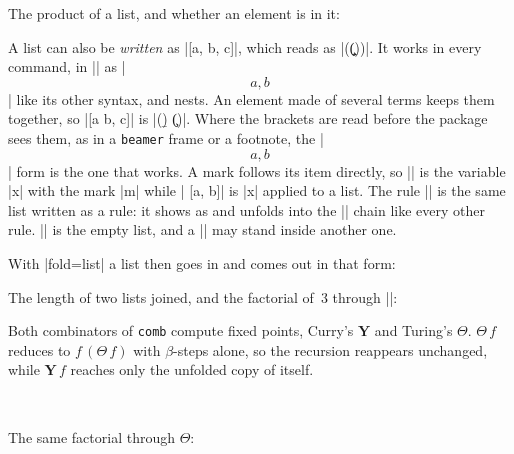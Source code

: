 \documentclass[parskip=half,english,numbers=noenddot,footnotes=nomultiple,oneside]{scrartcl}
\begin{document}
The product of a list, and whether an element is in it:
\begin{wideexample}
 \quad
{}
\end{wideexample}
A list can also be \emph{written} as |[a, b, c]|, which reads as |\cons \a (\cons \b (\cons \c \nil))|. It works in every command, in |\RLC| as |\[a, b\]| like its other syntax, and nests. An element made of several terms keeps them together, so |[a b, c]| is |\cons (\a \b) (\cons \c \nil)|. Where the brackets are read before the package sees them, as in a \texttt{beamer} frame or a footnote, the |\[a, b\]| form is the one that works. A mark follows its item directly, so |\x[m]| is the variable |x| with the mark |m| while | [a, b]| is |x| applied to a list. The rule || is the same list written as a rule: it shows as \LC[rule-depth=0]{\list{\a, \b, \c}} and unfolds into the |\cons| chain like every other rule. |\list{}| is the empty list, and a |\list| may stand inside another one.
\begin{wideexample}
\LC{\list{\a, \b, \c}} \quad
\lcNormalForm[fold=list, max-steps=500]{\tail (\list{\a, \b, \c})}
\end{wideexample}
With |fold=list| a list then goes in and comes out in that form:
\begin{wideexample}
\lcNormalForm[show-term, fold={list, num}, max-steps=500]
   {\append [\a] [\b]} \quad
\lcNormalForm[show-term, fold={list, num}, max-steps=500]
   {\tail [\a, \b]}
\end{wideexample}
\begin{wideexample}
 \quad
\lcNormalForm[show-term, fold={list, num}, max-steps=800]
   {\length [\a, \b]}
\end{wideexample}
The length of two lists joined, and the factorial of~\(3\) through |\Ycomb|:
\begin{wideexample}
\lcNormalForm[show-term, fold=num, max-steps=500]
   {\length (\append [\a] [\b])}

\end{wideexample}
Both combinators of \texttt{comb} compute fixed points, Curry's \(\mathbf{Y}\) and Turing's \(\Theta\). \(\Theta\,f\) reduces to \(f\,(\Theta\,f)\) with \(\beta\)-steps alone, so the recursion reappears unchanged, while \(\mathbf{Y}\,f\) reaches only the unfolded copy of itself.
\begin{example}
\LC[style=plain]{\Ycomb}\\
\LC[style=plain]{\Tcomb}
\end{example}
The same factorial through \(\Theta\):
\begin{wideexample}
\end{wideexample}
\end{document}
